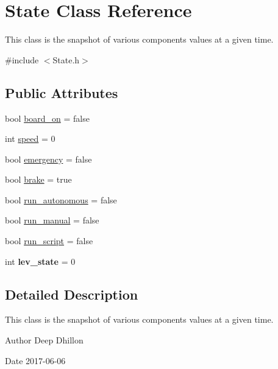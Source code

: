 \hypertarget{class_state}{}\section{State Class Reference}
\label{class_state}


This class is the snapshot of various components\textquotesingle{} values at a given time.  




{\ttfamily \#include $<$State.\+h$>$}

\subsection*{Public Attributes}
\begin{DoxyCompactItemize}
\item 
bool \hyperlink{class_state_aea23ca3e3e9162382305d332c04f409b}{board\+\_\+on} = false
\item 
int \hyperlink{class_state_afce303a17e5aa9bc5a1e062ed1b829e4}{speed} = 0
\item 
bool \hyperlink{class_state_a8d0db4a728e3b0c0d1f295c206526e46}{emergency} = false
\item 
bool \hyperlink{class_state_a3c08a5989b34e5ee4c43be5ecba050a1}{brake} = true
\item 
bool \hyperlink{class_state_a21ad44ffdf756efb9a207d4e80b7e248}{run\+\_\+autonomous} = false
\item 
bool \hyperlink{class_state_a2df36af0379e3d8608272150fce0ce7d}{run\+\_\+manual} = false
\item 
bool \hyperlink{class_state_a9deb72b03f3636b1a269f66d16cbc758}{run\+\_\+script} = false
\item 
\mbox{\label{class_state_afdcbf22d419f4b83382774ea04410cbd}} 
int {\bfseries lev\+\_\+state} = 0
\end{DoxyCompactItemize}


\subsection{Detailed Description}
This class is the snapshot of various components\textquotesingle{} values at a given time. 

\begin{DoxyAuthor}{Author}
Deep Dhillon 
\end{DoxyAuthor}
\begin{DoxyDate}{Date}
2017-\/06-\/06 
\end{DoxyDate}


